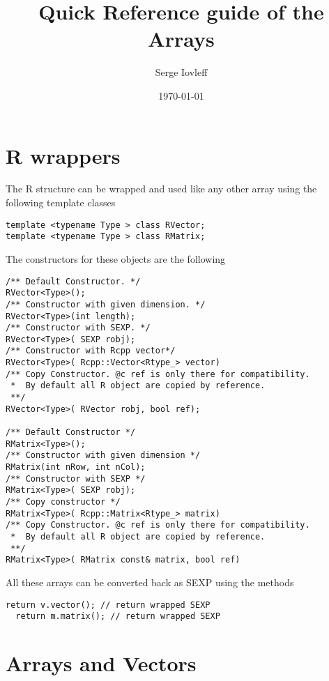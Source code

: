 \documentclass[a4paper,10pt]{article}
\title{ Quick Reference guide of the \stkpp{} Arrays}
\author{Serge Iovleff}
\date{\today}
\begin{document}

\maketitle
{}


\section{R wrappers}

The R structure  can be wrapped and used like any other
\stkpp{} array using the following template classes
\begin{lstlisting}[style=customcpp]
template <typename Type > class RVector;
template <typename Type > class RMatrix;
\end{lstlisting}

The constructors for these objects are the following
\begin{lstlisting}[style=customcpp]
/** Default Constructor. */
RVector<Type>();
/** Constructor with given dimension. */
RVector<Type>(int length);
/** Constructor with SEXP. */
RVector<Type>( SEXP robj);
/** Constructor with Rcpp vector*/
RVector<Type>( Rcpp::Vector<Rtype_> vector)
/** Copy Constructor. @c ref is only there for compatibility.
 *  By default all R object are copied by reference.
 **/
RVector<Type>( RVector robj, bool ref);

/** Default Constructor */
RMatrix<Type>();
/** Constructor with given dimension */
RMatrix(int nRow, int nCol);
/** Constructor with SEXP */
RMatrix<Type>( SEXP robj);
/** Copy constructor */
RMatrix<Type>( Rcpp::Matrix<Rtype_> matrix)
/** Copy Constructor. @c ref is only there for compatibility.
 *  By default all R object are copied by reference.
 **/
RMatrix<Type>( RMatrix const& matrix, bool ref)
\end{lstlisting}

All these arrays can be converted back as SEXP using the methods
\begin{lstlisting}[style=customcpp]
  return v.vector(); // return wrapped SEXP
  return m.matrix(); // return wrapped SEXP
\end{lstlisting}

\section{\stkpp{} Arrays and Vectors}
\end{document}
